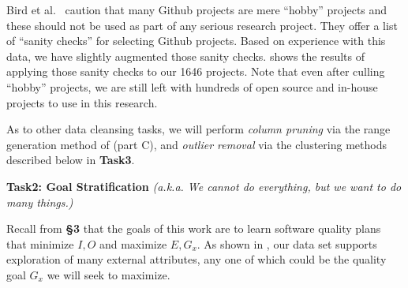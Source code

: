 Bird et al.~\cite{bird2009promises} caution that many  Github projects are mere ``hobby'' projects and these should not be used as part of any serious research project.
They offer a list of ``sanity checks'' for selecting Github projects. Based on experience with this  data, we have slightly
augmented those sanity checks.  shows the results of applying those sanity checks to our 1646 projects. Note that even after culling ``hobby''
projects, we are still left with hundreds of open source and in-house projects to use in this research.
 

 As to other data cleansing tasks, we will perform {\em column pruning} via the range generation method of  (part C),
and {\em outlier removal} via the clustering methods described below in {\bf Task3}.


 
\noindent
{\bf Task2: Goal Stratification} {\em (a.k.a. We cannot do everything, but we want to do many things.)}
 
 Recall from  {\bf \S{3}} that  the goals of this work are to learn software quality plans that minimize $I,O$ and maximize $E,G_x$. 
As shown in ,
our data set supports
exploration of many external attributes, any one of which could be the quality goal $G_x$ we will seek to maximize.

